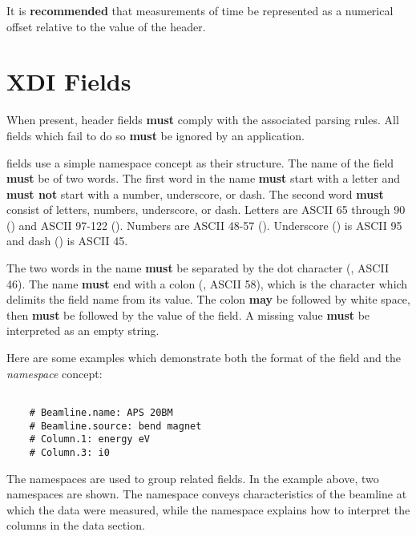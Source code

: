 \documentclass{article}
\begin{document}
It is \textbf{recommended} that measurements of time be represented as
a numerical offset relative to the value of the
 header.



\section{XDI Fields}
\label{sec:ixsif_fields}

When present, header fields \textbf{must} comply with the associated
parsing rules.  All fields which fail to do so \textbf{must} be
ignored by an application.

{\xdi} fields use a simple namespace concept as their structure.  The
name of the field \textbf{must} be of two words.  The first word in
the name \textbf{must} start with a letter and \textbf{must not} start
with a number, underscore, or dash.  The second word \textbf{must}
consist of letters, numbers, underscore, or dash.  Letters are ASCII
65 through 90 () and ASCII 97-122 ().  Numbers
are ASCII 48-57 ().  Underscore (\xditt{\_}) is ASCII 95
and dash (\xditt{-}) is ASCII 45.

The two words in the name \textbf{must} be separated by the dot
character (, ASCII 46). The name \textbf{must} end with a
colon (\xditt{:}, ASCII 58), which is the character which delimits
the field name from its value.  The colon \textbf{may} be followed by
white space, then \textbf{must} be followed by the value of the field.
A missing value \textbf{must} be interpreted as an empty string.

Here are some examples which demonstrate both the format of the {\xdi}
field and the \textit{namespace} concept:

\begin{center}
\begin{Boxedminipage}[h]{0.7\linewidth}
\begin{verbatim}

    # Beamline.name: APS 20BM
    # Beamline.source: bend magnet
    # Column.1: energy eV
    # Column.3: i0

\end{verbatim}
\end{Boxedminipage}
\end{center}

The namespaces are used to group related fields.  In the example
above, two namespaces are shown.  The  namespace
conveys characteristics of the beamline at which the data were
measured, while the  namespace explains how to
interpret the columns in the data section.
\end{document}
